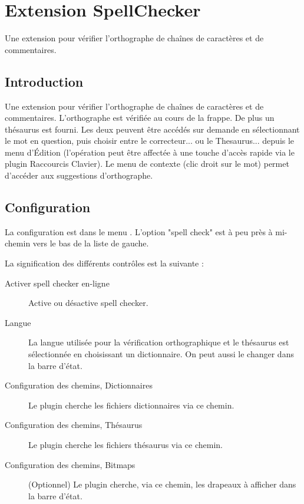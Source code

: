 \section{Extension SpellChecker}\label{sec:spell_checker}

Une extension pour vérifier l'orthographe de chaînes de caractères et de commentaires.

\subsection{Introduction}
Une extension pour vérifier l'orthographe de chaînes de caractères et de commentaires. L'orthographe est vérifiée au cours de la frappe. De plus un thésaurus est fourni. Les deux peuvent être accédés sur demande en sélectionnant le mot en question, puis choisir entre le correcteur... ou le Thesaurus... depuis le menu d'Édition (l'opération peut être affectée à une touche d'accès rapide via le plugin Raccourcis Clavier). Le menu de contexte (clic droit sur le mot) permet d'accéder aux suggestions d'orthographe. 

\subsection{Configuration}

La configuration est dans le menu . L'option "spell check" est à peu près à mi-chemin vers le bas de la liste de gauche.


La signification des différents contrôles est la suivante : 
\begin{description}
\item[Activer spell checker en-ligne] Active ou désactive spell checker.
\item[Langue] La langue utilisée pour la vérification orthographique et le thésaurus est sélectionnée en choisissant un dictionnaire. On peut aussi le changer dans la barre d'état.
\item[Configuration des chemins, Dictionnaires] Le plugin cherche les fichiers dictionnaires via ce chemin.
\item[Configuration des chemins, Thésaurus] Le plugin cherche les fichiers thésaurus via ce chemin.
\item[Configuration des chemins, Bitmaps] (Optionnel) Le plugin cherche, via ce chemin, les drapeaux à afficher dans la barre d'état.
\end{description}

